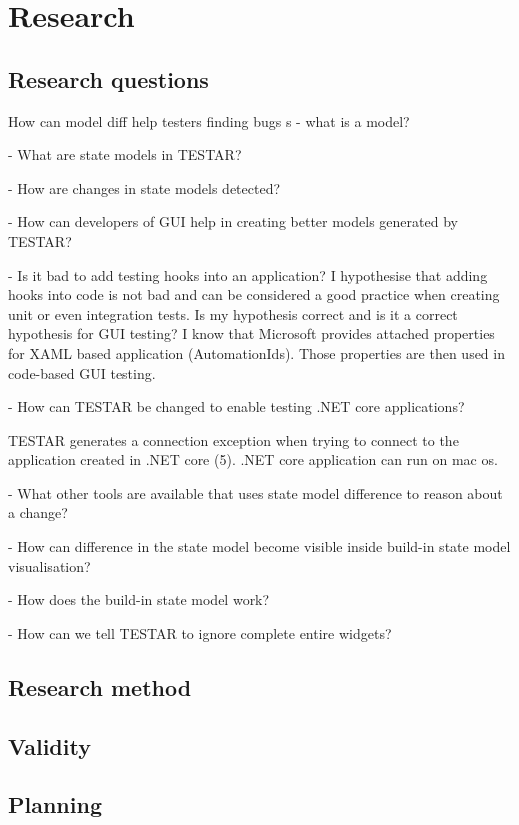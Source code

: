 \section{Research}

\subsection{Research questions}

How can model diff help testers finding bugs
s
- what is a model?

- What are state models in TESTAR?

- How are changes in state models detected?

- How can developers of GUI help in creating better models generated by TESTAR?

- Is it bad to add testing hooks into an application? I hypothesise that adding hooks into code is not bad and can be considered a good practice when creating unit or even integration tests. Is my hypothesis correct and is it a correct hypothesis for GUI testing? I know that Microsoft provides attached properties for XAML based application (AutomationIds). Those properties are then used in code-based GUI testing.


- How can TESTAR be changed to enable testing .NET core applications?

TESTAR generates a connection exception when trying to connect to the application created in .NET core (5). .NET core application can run on mac os. 

- What other tools are available that uses state model difference to reason about a change? 

- How can difference in the state model become visible inside build-in state model visualisation?

- How does the build-in state model work?

- How can we tell TESTAR to ignore complete entire widgets?



\subsection{Research method}

\subsection{Validity}

\subsection{Planning}